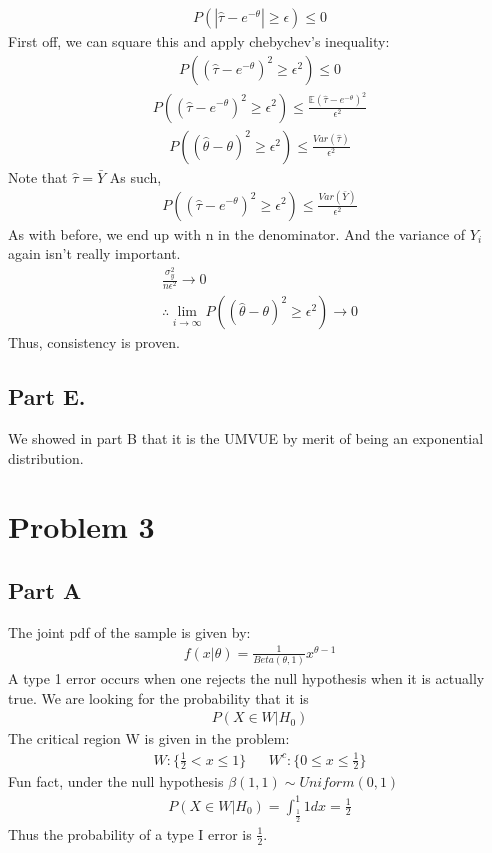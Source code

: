 \documentclass{article}
\begin{document}
\begin{align*}
P(| \hat{\tau} - e^{-\theta}| \geq \epsilon) \leq 0
\end{align*}
First off, we can square this and apply chebychev's inequality:
\begin{align*}
P(( \hat{\tau} - e^{-\theta})^2 \geq \epsilon^2) \leq 0
\end{align*}
\begin{align*}
P(( \hat{\tau} - e^{-\theta})^2 \geq \epsilon^2) \leq \frac{\mathbb{E}(\hat{\tau} - e^{-\theta})^2}{\epsilon^2}
\end{align*}
\begin{align*}
P(( \hat{\theta} - \theta)^2 \geq \epsilon^2) \leq \frac{Var(\hat{\tau})}{\epsilon^2}
\end{align*}
Note that $\hat{\tau}=\bar{Y}$ As such, 
\begin{align*}
P(( \hat{\tau} - e^{-\theta})^2 \geq \epsilon^2) \leq \frac{Var(\bar{Y})}{\epsilon^2}
\end{align*}
As with before, we end up with n in the denominator. And the variance of $Y_i$ again isn't really important.
\begin{align*}
\frac{\sigma_y^2}{n \epsilon^2} \rightarrow 0 \\
\therefore \lim_{i \rightarrow \infty} P(( \hat{\theta} - \theta)^2 \geq \epsilon^2) \rightarrow 0
\end{align*}
Thus, consistency is proven.
\subsection*{Part E.}
We showed in part B that it is the UMVUE by merit of being an exponential distribution.

\clearpage

\section*{Problem 3}

\subsection*{Part A}
The joint pdf of the sample is given by:
\begin{align*}
f(x|\theta) = \frac{1}{Beta(\theta,1)}  x^{\theta-1}
\end{align*}
A type 1 error occurs when one rejects the null hypothesis when it is actually true. We are looking for the probability that it is
\begin{align*}
P(X \in W|H_0)
\end{align*}
The critical region W is given in the problem:
\begin{align*}
W:\{ \frac{1}{2} < x \leq 1 \} && W^c:\{ 0 \leq x \leq \frac{1}{2} \}
\end{align*}
Fun fact, under the null hypothesis $\beta(1,1) \sim Uniform(0,1)$ 
\begin{align*}
P(X \in W|H_0) = \int_{\frac{1}{2}}^{1} 1 dx = \frac{1}{2}
\end{align*}
Thus the probability of a type I error is $\frac{1}{2}$.
\end{document}
